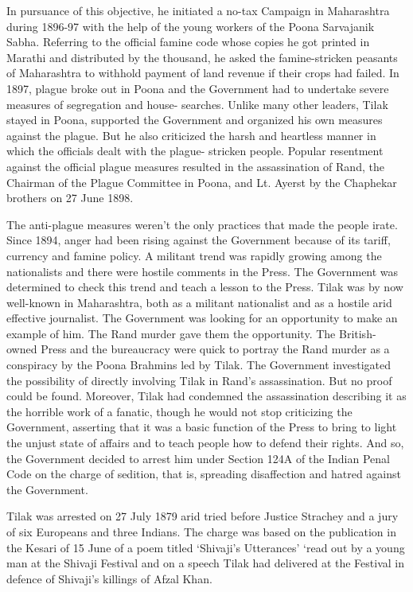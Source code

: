 In pursuance of this objective, he initiated a no-tax Campaign in Maharashtra during 1896-97 with the help of the young workers of the Poona Sarvajanik Sabha. Referring to the official famine code whose copies he got printed in Marathi and distributed by the thousand, he asked the famine-stricken peasants of Maharashtra to withhold payment of land revenue if their crops had failed. In 1897, plague broke out in Poona and the Government had to undertake severe measures of segregation and house- searches. Unlike many other leaders, Tilak stayed in Poona, supported the Government and organized his own measures against the plague. But he also criticized the harsh and heartless manner in which the officials dealt with the plague- stricken people. Popular resentment against the official plague measures resulted in the assassination of Rand, the Chairman of the Plague Committee in Poona, and Lt. Ayerst by the Chaphekar brothers on 27 June 1898.

The anti-plague measures weren't the only practices that made the people irate. Since 1894, anger had been rising against the Government because of its tariff, currency and famine policy. A militant trend was rapidly growing among the nationalists and there were hostile comments in the Press. The Government was determined to check this trend and teach a lesson to the Press. Tilak was by now well-known in Maharashtra, both as a militant nationalist and as a hostile arid effective journalist. The Government was looking for an opportunity to make an example of him. The Rand murder gave them the opportunity. The British- owned Press and the bureaucracy were quick to portray the Rand murder as a conspiracy by the Poona Brahmins led by Tilak. The Government investigated the possibility of directly involving Tilak in Rand's assassination. But no proof could be found. Moreover, Tilak had condemned the assassination describing it as the horrible work of a fanatic, though he would not stop criticizing the Government, asserting that it was a basic function of the Press to bring to light the unjust state of affairs and to teach people how to defend their rights. And so, the Government decided to arrest him under Section 124A of the Indian Penal Code on the charge of sedition, that is, spreading disaffection and hatred against the Government.

Tilak was arrested on 27 July 1879 arid tried before Justice Strachey and a jury of six Europeans and three Indians. The charge was based on the publication in the Kesari of 15 June of a poem titled `Shivaji's Utterances' `read out by a young man at the Shivaji Festival and on a speech Tilak had delivered at the Festival in defence of Shivaji's killings of Afzal Khan.


